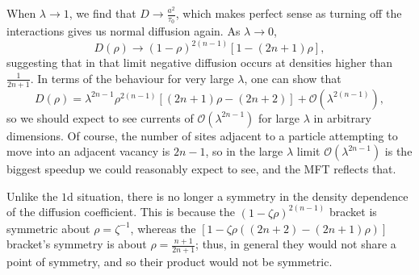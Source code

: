 When $\lambda \rightarrow 1$, we find that $D \rightarrow \frac{a^2}{\tau_0}$, which makes perfect sense as turning off the interactions gives us normal diffusion again. As $\lambda \rightarrow 0$,
\begin{equation}
 D(\rho) \rightarrow (1-\rho)^{2(n-1)} \left[ 1 - (2n+1)\rho \right],
\end{equation}
suggesting that in that limit negative diffusion occurs at densities higher than $\frac{1}{2n+1}$.
In terms of the behaviour for very large $\lambda$, one can show that
\begin{equation}
 D(\rho) = \lambda^{2n-1} \rho^{2(n-1)} \left[ (2n+1)\rho - (2n+2) \right] + \mathcal{O}(\lambda^{2(n-1)}),
\end{equation}
so we should expect to see currents of $\mathcal{O}(\lambda^{2n-1})$ for large $\lambda$ in arbitrary
dimensions. Of course, the number of sites adjacent to a particle attempting to move into an adjacent vacancy
is $2n-1$, so in the large $\lambda$ limit $\mathcal{O}(\lambda^{2n-1})$ is the biggest speedup
we could reasonably expect to see, and the MFT reflects that.

Unlike the $1$d situation, there is no longer a symmetry in the density dependence of the
diffusion coefficient. This is because the $\left( 1 - \zeta \rho \right)^{2(n-1)}$ bracket is
symmetric about $\rho=\zeta^{-1}$, whereas the $\left[ 1 - \zeta \rho\left( (2n+2) - (2n+1)\rho \right) \right] $ bracket's symmetry is about $\rho=\frac{n+1}{2n+1}$; thus, in general they would not share
a point of symmetry, and so their product would not be symmetric.

